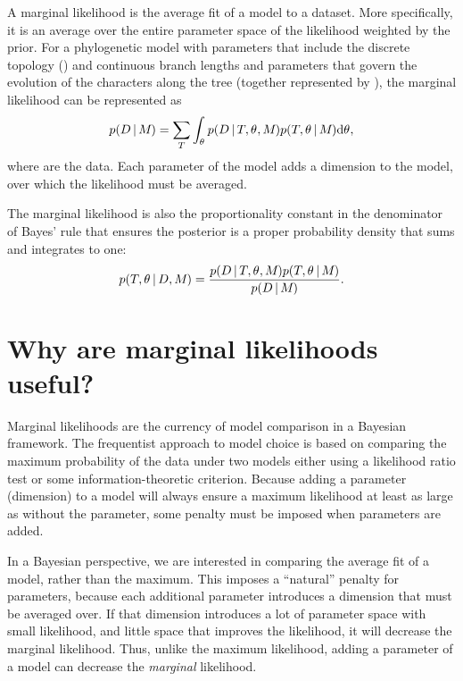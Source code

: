\begin{linenomath}
A marginal likelihood is the average fit of a model to a dataset.
More specifically, it is an average over the entire parameter space of the
likelihood weighted by the prior.
For a phylogenetic model \model with parameters that include the discrete
topology (\topology) and continuous branch lengths and parameters that govern
the evolution of the characters along the tree (together represented by
\evoparameters), the marginal likelihood can be represented as
\begin{equation}
    p(D \,|\, M_{}) =
    \sum\limits_{T}
    \int_{\theta_{}}
    p( D \,|\, T, \theta_{}, M_{})
    p(T, \theta_{} \,|\, M_{})
    \mathrm{d}\theta_{},
    \label{eq:marginalLikelihood}
\end{equation}
where \data are the data.
Each parameter of the model adds a dimension to the model, over which the
likelihood must be averaged.
\end{linenomath}

\begin{linenomath}
The marginal likelihood is also the proportionality constant in the denominator
of Bayes' rule that ensures the posterior is a proper probability density that
sums and integrates to one:
\begin{equation}
    p(T, \theta_{} \,|\, D, M_{}) = \frac{
        p(D \,|\, T, \theta_{}, M_{})
        p(T, \theta_{} \,|\, M_{})
    }{
        p(D \,|\, M_{})
    }.
    \label{eq:bayesRule}
\end{equation}
\end{linenomath}

\section{Why are marginal likelihoods useful?}

Marginal likelihoods are the currency of model comparison in a Bayesian
framework. The frequentist approach to model choice is based on comparing
the maximum probability of the data under two models either using
a likelihood ratio test or some information-theoretic criterion.
Because adding a parameter (dimension) to a model will always ensure
a maximum likelihood at least as large as without the parameter, some
penalty must be imposed when parameters are added.

In a Bayesian perspective, we are interested in comparing the average fit of a
model, rather than the maximum.
This imposes a ``natural'' penalty for parameters, because each additional
parameter introduces a dimension that must be averaged over.
If that dimension introduces a lot of parameter space with small likelihood,
and little space that improves the likelihood, it will decrease the marginal
likelihood.
Thus, unlike the maximum likelihood, adding a parameter of a model can
decrease the \emph{marginal} likelihood.

